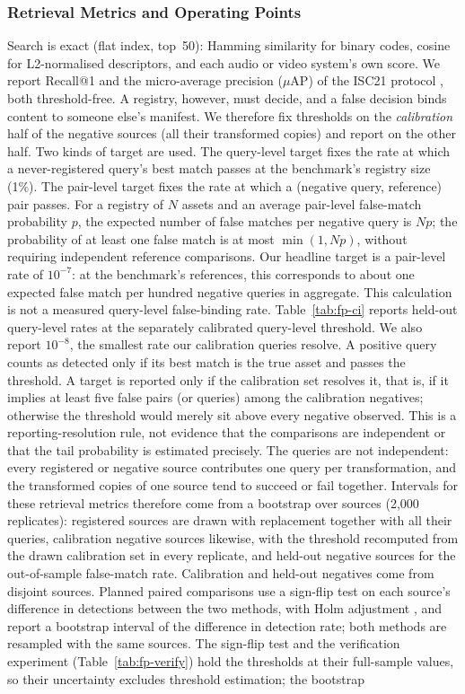 \subsubsection{Retrieval Metrics and Operating Points}
Search is exact (flat index, top~50): Hamming similarity for binary codes, cosine for L2-normalised descriptors, and each audio or video system's own score. We report Recall@1 and the micro-average precision ($\mu$AP) of the ISC21 protocol \cite{douze2021isc}, both threshold-free. A registry, however, must decide, and a false decision binds content to someone else's manifest. We therefore fix thresholds on the \emph{calibration} half of the negative sources (all their transformed copies) and report on the other half. Two kinds of target are used. The query-level target fixes the rate at which a never-registered query's best match passes at the benchmark's registry size (1\%). The pair-level target fixes the rate at which a (negative query, reference) pair passes. For a registry of $N$ assets and an average pair-level false-match probability $p$, the expected number of false matches per negative query is $Np$; the probability of at least one false match is at most $\min(1,Np)$, without requiring independent reference comparisons. Our headline target is a pair-level rate of $10^{-7}$: at the benchmark's  references, this corresponds to about one expected false match per hundred negative queries in aggregate. This calculation is not a measured query-level false-binding rate. Table~\ref{tab:fp-ci} reports held-out query-level rates at the separately calibrated query-level threshold. We also report $10^{-8}$, the smallest rate our  calibration queries resolve. A positive query counts as detected only if its best match is the true asset and passes the threshold. A target is reported only if the calibration set resolves it, that is, if it implies at least five false pairs (or queries) among the calibration negatives; otherwise the threshold would merely sit above every negative observed. This is a reporting-resolution rule, not evidence that the comparisons are independent or that the tail probability is estimated precisely. The queries are not independent: every registered or negative source contributes one query per transformation, and the transformed copies of one source tend to succeed or fail together. Intervals for these retrieval metrics therefore come from a bootstrap over sources (2{,}000 replicates): registered sources are drawn with replacement together with all their queries, calibration negative sources likewise, with the threshold recomputed from the drawn calibration set in every replicate, and held-out negative sources for the out-of-sample false-match rate. Calibration and held-out negatives come from disjoint sources. Planned paired comparisons use a sign-flip test on each source's difference in detections between the two methods, with Holm adjustment \cite{holm1979}, and report a bootstrap interval of the difference in detection rate; both methods are resampled with the same sources. The sign-flip test and the verification experiment (Table~\ref{tab:fp-verify}) hold the thresholds at their full-sample values, so their uncertainty excludes threshold estimation; the bootstrap 